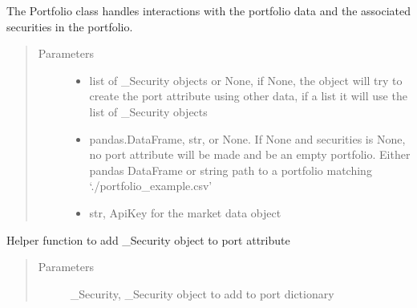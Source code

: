 \documentclass[letterpaper,10pt,english]{sphinxmanual}
\begin{document}
\begin{fulllineitems}
\label{\detokenize{securities:risk_dash.securities.Portfolio}}
\sphinxAtStartPar
The Portfolio class handles interactions with the portfolio data and the associated securities in the portfolio.
\begin{quote}\begin{description}
\item[{Parameters}] \leavevmode\begin{itemize}
\item {} 
\sphinxAtStartPar
{} \textendash{} list of \_Security objects or None, if None, the object will try to create the port attribute using other data, if a list it will use the list of \_Security objects

\item {} 
\sphinxAtStartPar
{} \textendash{} pandas.DataFrame, str, or None. If None and securities is None, no port attribute will be made and be an empty portfolio. Either pandas DataFrame or string path to a portfolio matching ‘./portfolio\_example.csv’

\item {} 
\sphinxAtStartPar
{} \textendash{} str, ApiKey for the market data object

\end{itemize}

\end{description}\end{quote}

\begin{fulllineitems}
\label{\detokenize{securities:risk_dash.securities.Portfolio.add_security}}
\sphinxAtStartPar
Helper function to add \_Security object to port attribute
\begin{quote}\begin{description}
\item[{Parameters}] \leavevmode
\sphinxAtStartPar
{} \textendash{} \_Security, \_Security object to add to port dictionary


\end{description}
\end{quote}
\end{fulllineitems}
\end{fulllineitems}
\end{document}
